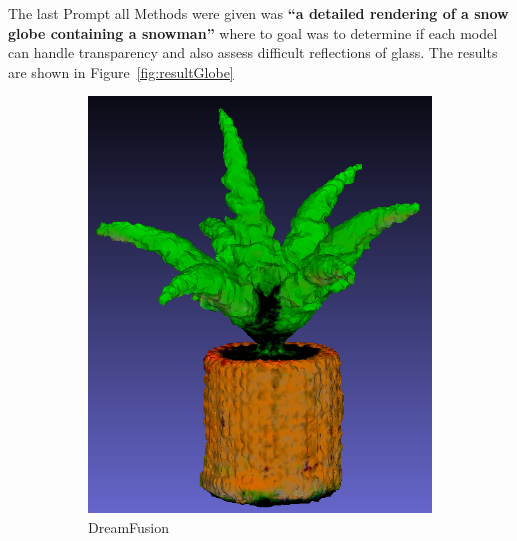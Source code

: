 The last Prompt all Methods were given was \textbf{``a detailed rendering of a snow globe containing a snowman''} where to goal was to determine if each model can handle transparency and also assess difficult reflections of glass. The results are shown in Figure~\ref{fig:resultGlobe}

  \begin{figure}[ht]
    \centering
    \small
    \begin{subfigure}[b]{0.24\textwidth}
        \centering
        \includegraphics[width=\textwidth]{etc/a high-quality rendering of a fern in a wooden pot/dreamfusion/dreamfusion_fern_result.png}
        \caption{DreamFusion}
        \vspace{0.1cm}
    \end{subfigure}
    \begin{subfigure}[b]{0.35\textwidth}
        \centering

\end{subfigure}
\end{figure}

